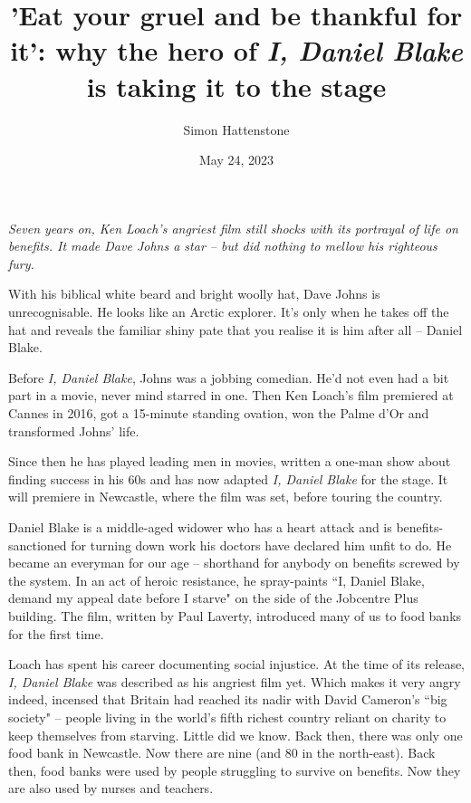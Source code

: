\documentclass[10pt,a4paper]{article}
\newcommand{\qm}[1]{``#1"}
\begin{document}
\title{'Eat your gruel and be thankful for it': why the hero of {\plantin\textit{I, Daniel Blake}} is taking it to the stage}
\date{May 24, 2023}
\author{Simon Hattenstone}

\maketitle

\noindent\textit{Seven years on, Ken Loach's angriest film still shocks with its portrayal of life on benefits. It made Dave Johns a star -- but did nothing to mellow his righteous fury.}

\bigskip

\noindent\linenumbers With his biblical white beard and bright woolly hat, Dave Johns is unrecognisable. He looks like an Arctic explorer. It's only when he takes off the hat and reveals the familiar shiny pate that you realise it is him after all -- Daniel Blake.

Before \textit{I, Daniel Blake}, Johns was a jobbing comedian. He'd not even had a bit part in a movie, never mind starred in one. Then Ken Loach's film premiered at Cannes in 2016, got a 15-minute standing ovation, won the Palme d'Or and transformed Johns' life.

Since then he has played leading men in movies, written a one-man show about finding success in his 60s and has now adapted \textit{I, Daniel Blake} for the stage. It will premiere in Newcastle, where the film was set, before touring the country.

Daniel Blake is a middle-aged widower who has a heart attack and is benefits-sanctioned for turning down work his doctors have declared him unfit to do. He became an everyman for our age -- shorthand for anybody on benefits screwed by the system. In an act of heroic resistance, he spray-paints \qm{I, Daniel Blake, demand my appeal date before I starve} on the side of the Jobcentre Plus building. The film, written by Paul Laverty, introduced many of us to food banks for the first time.

Loach has spent his career documenting social injustice. At the time of its release, \textit{I, Daniel Blake} was described as his angriest film yet. Which makes it very angry indeed, incensed that Britain had reached its nadir with David Cameron's \qm{big society} -- people living in the world's fifth richest country reliant on charity to keep themselves from starving. Little did we know. Back then, there was only one food bank in Newcastle. Now there are nine (and 80 in the north-east). Back then, food banks were used by people struggling to survive on benefits. Now they are also used by nurses and teachers.
\end{document}
